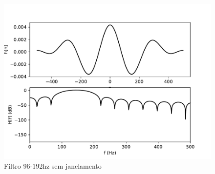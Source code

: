 \begin{figure}[H]
        \begin{center}
            \includegraphics[scale=0.4]{fig/filter2.pdf}\\
            \small{Filtro 96-192hz sem janelamento}
    

\end{center}
\end{figure}
